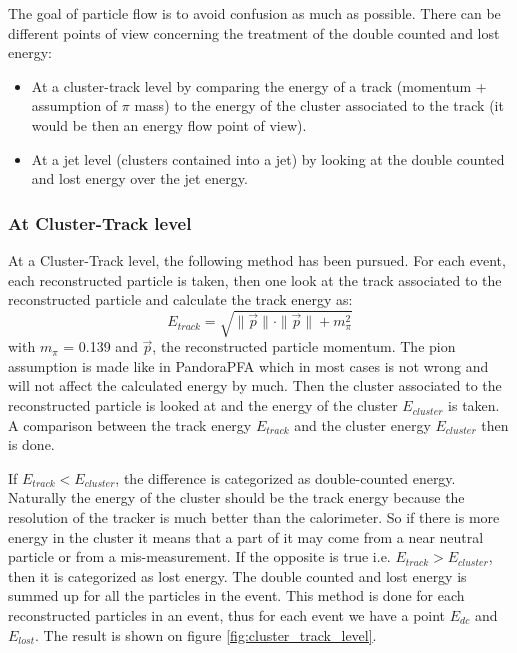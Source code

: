 The goal of particle flow is to avoid confusion as much as possible. There can be different points of view concerning the treatment of the double counted and lost energy:
\begin{itemize}
  \item At a cluster-track level by comparing the energy of a track (momentum + assumption of $\pi$ mass) to the energy of the cluster associated to the track (it would be then an energy flow point of view).
  \item At a jet level (clusters contained into a jet) by looking at the double counted and lost energy over the jet energy.
\end{itemize}

\subsubsection{At Cluster-Track level}

At a Cluster-Track level, the following method has been pursued. For each event, each reconstructed particle is taken, then one look at the track associated to the reconstructed particle and calculate the track energy as:
\begin{equation}
  E_{track} = \sqrt{\|\overrightarrow{p}\| \cdot \|\overrightarrow{p}\| + m_{\pi}^{2}}
\end{equation}
with $m_{\pi}$ = 0.139 \GeV and $\overrightarrow{p}$, the reconstructed particle momentum. The pion assumption is made like in PandoraPFA which in most cases is not wrong and will not affect the calculated energy by much. Then the cluster associated to the reconstructed particle is looked at and the energy of the cluster $E_{cluster}$ is taken. A comparison between the track energy $E_{track}$ and the cluster energy $E_{cluster}$ then is done.

If $E_{track} < E_{cluster}$, the difference is categorized as double-counted energy. Naturally the energy of the cluster should be the track energy because the resolution of the tracker is much better than the calorimeter. So if there is more energy in the cluster it means that a part of it may come from a near neutral particle or from a mis-measurement. If the opposite is true i.e. $E_{track} > E_{cluster}$, then it is categorized as lost energy. The double counted and lost energy is summed up for all the particles in the event. This method is done for each reconstructed particles in an event, thus for each event we have a point $E_{dc}$ and $E_{lost}$. The result is shown on figure \ref{fig:cluster_track_level}.

